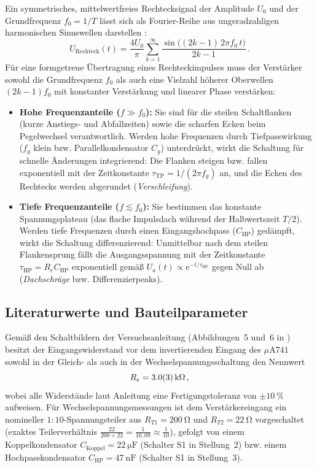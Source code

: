 \documentclass[12pt,a4paper,titlepage]{scrartcl}
\numberwithin{equation}{section}
\numberwithin{table}{section}
\numberwithin{figure}{section}
\begin{document}
Ein symmetrisches, mittelwertfreies Rechtecksignal der Amplitude $U_0$ und der Grundfrequenz $f_0 = 1/T$ lässt sich als Fourier-Reihe aus ungeradzahligen harmonischen Sinuswellen darstellen \cite{ilberg1988physikalisches}:
\begin{equation}
    U_{\text{Rechteck}}(t) = \frac{4 U_0}{\pi} \sum_{k=1}^{\infty} \frac{\sin\!\big((2k-1)\,2\pi f_0\, t\big)}{2k-1} \,.
    \label{eq:fourier_rechteck}
\end{equation}
Für eine formgetreue Übertragung eines Rechteckimpulses muss der Verstärker sowohl die Grundfrequenz $f_0$ als auch eine Vielzahl höherer Oberwellen $(2k-1)f_0$ mit konstanter Verstärkung und linearer Phase verstärken:
\begin{itemize}
    \item \textbf{Hohe Frequenzanteile ($f \gg f_0$):} Sie sind für die steilen Schaltflanken (kurze Anstiegs- und Abfallzeiten) sowie die scharfen Ecken beim Pegelwechsel verantwortlich. Werden hohe Frequenzen durch Tiefpasswirkung ($f_g$ klein bzw. Parallelkondensator $C_g$) unterdrückt, wirkt die Schaltung für schnelle Änderungen integrierend: Die Flanken steigen bzw. fallen exponentiell mit der Zeitkonstante $\tau_{\text{TP}} = 1/(2\pi f_g)$ an, und die Ecken des Rechtecks werden abgerundet (\emph{Verschleifung}).
    \item \textbf{Tiefe Frequenzanteile ($f \lesssim f_0$):} Sie bestimmen das konstante Spannungsplateau (das flache Impulsdach während der Halbwertszeit $T/2$). Werden tiefe Frequenzen durch einen Eingangshochpass ($C_{\text{HP}}$) gedämpft, wirkt die Schaltung differenzierend: Unmittelbar nach dem steilen Flankensprung fällt die Ausgangsspannung mit der Zeitkonstante $\tau_{\text{HP}} = R_e C_{\text{HP}}$ exponentiell gemäß $U_a(t) \propto \mathrm{e}^{-t/\tau_{\text{HP}}}$ gegen Null ab (\emph{Dachschräge} bzw. Differenzierpeaks).
\end{itemize}

\subsection{Literaturwerte und Bauteilparameter}

Gemäß den Schaltbildern der Versuchsanleitung (Abbildungen~5 und~6 in \cite{PAPskript}) besitzt der Eingangswiderstand vor dem invertierenden Eingang des $\mu\text{A}741$ sowohl in der Gleich- als auch in der Wechselspannungsschaltung den Nennwert
\begin{equation*}
    R_e = \SI{3.0 +- 0.3}{\kilo\ohm} \,,
\end{equation*}
wobei alle Widerstände laut Anleitung eine Fertigungstoleranz von $\pm\SI{10}{\percent}$ aufweisen. Für Wechselspannungsmessungen ist dem Verstärkereingang ein nomineller $1{:}10$-Spannungsteiler aus $R_{T1} = \SI{200}{\ohm}$ und $R_{T2} = \SI{22}{\ohm}$ vorgeschaltet (exaktes Teilerverhältnis $\frac{22}{200+22} = \frac{1}{10{,}09} \approx \frac{1}{10}$), gefolgt von einem Koppelkondensator $C_{\text{Koppel}} = \SI{22}{\micro\farad}$ (Schalter S1 in Stellung~2) bzw. einem Hochpasskondensator $C_{\text{HP}} = \SI{47}{\nano\farad}$ (Schalter S1 in Stellung~3).
\end{document}
